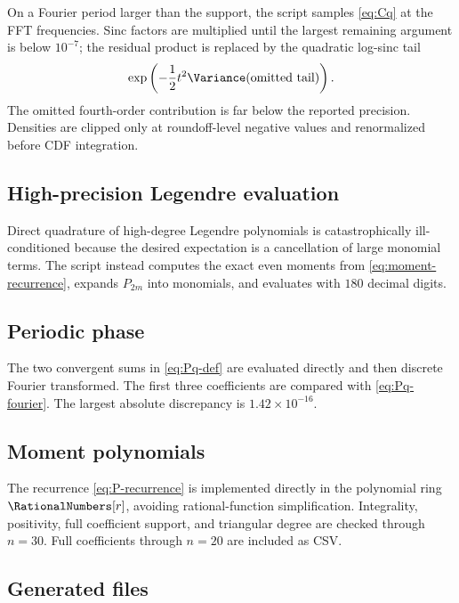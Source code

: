 \documentclass[11pt,oneside]{article}
\theoremstyle{definition}
\theoremstyle{remark}
\begin{document}
On a Fourier period larger than the support, the script samples \cref{eq:Cq} at the FFT frequencies.  Sinc factors are multiplied until the largest remaining argument is below $10^{-7}$; the residual product is replaced by the quadratic log-sinc tail
\[
 \exp\left(-\frac12t^2\Variance(\text{omitted tail})\right).
\]
The omitted fourth-order contribution is far below the reported precision.  Densities are clipped only at roundoff-level negative values and renormalized before CDF integration.

\subsection{High-precision Legendre evaluation}

Direct quadrature of high-degree Legendre polynomials is catastrophically ill-conditioned because the desired expectation is a cancellation of large monomial terms.  The script instead computes the exact even moments from \cref{eq:moment-recurrence}, expands $P_{2m}$ into monomials, and evaluates with $180$ decimal digits.

\subsection{Periodic phase}

The two convergent sums in \cref{eq:Pq-def} are evaluated directly and then discrete Fourier transformed.  The first three coefficients are compared with \cref{eq:Pq-fourier}.  The largest absolute discrepancy is $1.42\times10^{-16}$.

\subsection{Moment polynomials}

The recurrence \cref{eq:P-recurrence} is implemented directly in the polynomial ring $\RationalNumbers[r]$, avoiding rational-function simplification.  Integrality, positivity, full coefficient support, and triangular degree are checked through $n=30$.  Full coefficients through $n=20$ are included as CSV.

\subsection{Generated files}
\end{document}
